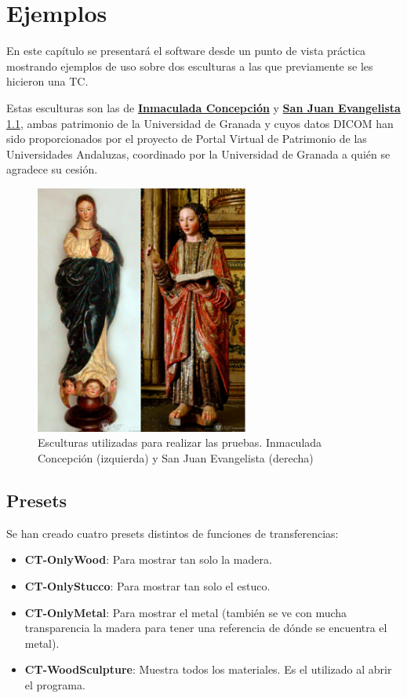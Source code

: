 \chapter{Ejemplos}

En este capítulo se presentará el software desde un punto de vista práctica mostrando ejemplos de uso sobre dos esculturas a las que previamente se les hicieron una TC.

Estas esculturas son las de \href{http://patrimonio3d.ugr.es/index.php/granada/escultura/item/18-inmaculada-concepcion}{\textbf{Inmaculada Concepción}} y \href{http://patrimonio3d.ugr.es/index.php/granada/escultura/item/6-san-juan-evangelista}{\textbf{San Juan Evangelista}} \ref{fig:figuras_reales}, ambas patrimonio de la Universidad de Granada y cuyos datos DICOM han sido proporcionados por el proyecto de Portal Virtual de Patrimonio de las Universidades Andaluzas, coordinado por la Universidad de Granada a quién se agradece su cesión.

\begin{figure}[H]
	\centering
	\includegraphics[width=7cm]{imagenes/figuras_reales}
	\caption{Esculturas utilizadas para realizar las pruebas. Inmaculada Concepción (izquierda) y San Juan Evangelista (derecha)}
	\label{fig:figuras_reales}
\end{figure}

\section{Presets}

Se han creado cuatro presets distintos de funciones de transferencias:

\begin{itemize}
	\item \textbf{CT-OnlyWood}: Para mostrar tan solo la madera.
	\item \textbf{CT-OnlyStucco}: Para mostrar tan solo el estuco.
	\item \textbf{CT-OnlyMetal}: Para mostrar el metal (también se ve con mucha transparencia la madera para tener una referencia de dónde se encuentra el metal).
	\item \textbf{CT-WoodSculpture}: Muestra todos los materiales. Es el utilizado al abrir el programa.
\end{itemize}

